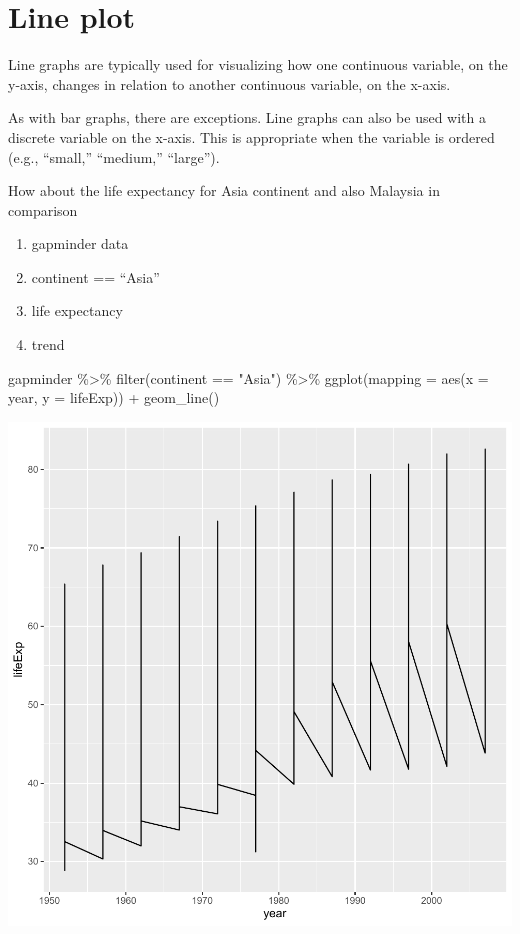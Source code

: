 \documentclass[
]{book}
\makeatletter
\newenvironment{Shaded}{\begin{snugshade}}{\end{snugshade}}
\newcommand{\AttributeTok}[1]{\textcolor[rgb]{0.61,0.61,0.61}{#1}}
\newcommand{\FunctionTok}[1]{\textcolor[rgb]{0,0,0}{#1}}
\newcommand{\NormalTok}[1]{#1}
\newcommand{\SpecialCharTok}[1]{\textcolor[rgb]{0,0,0}{#1}}
\newcommand{\StringTok}[1]{\textcolor[rgb]{0.5,0.5,0.5}{#1}}
\providecommand{\tightlist}{%
  \setlength{\itemsep}{0pt}\setlength{\parskip}{0pt}}
\newenvironment{kframe}{%
\medskip{}
\setlength{\fboxsep}{.8em}
 \def\at@end@of@kframe{}%
 \ifinner\ifhmode%
  \def\at@end@of@kframe{\end{minipage}}%
  \begin{minipage}{\columnwidth}%
 \fi\fi%
 \def\FrameCommand##1{\hskip\@totalleftmargin \hskip-\fboxsep
 \colorbox{shadecolor}{##1}\hskip-\fboxsep
     \hskip-\linewidth \hskip-\@totalleftmargin \hskip\columnwidth}%
 \MakeFramed {\advance\hsize-\width
   \@totalleftmargin\z@ \linewidth\hsize
   \@setminipage}}%
 {\par\unskip\endMakeFramed%
 \at@end@of@kframe}
\renewenvironment{Shaded}{\begin{kframe}}{\end{kframe}}
\makeatother
\begin{document}
\hypertarget{line-plot}{%
\section{Line plot}\label{line-plot}}

Line graphs are typically used for visualizing how one continuous variable, on the y-axis, changes in relation to another continuous variable, on the x-axis.

As with bar graphs, there are exceptions. Line graphs can also be used with a discrete variable on the x-axis. This is appropriate when the variable is ordered (e.g., ``small,'' ``medium,'' ``large'').

How about the life expectancy for Asia continent and also Malaysia in comparison

\begin{enumerate}
\def\labelenumi{\arabic{enumi}.}
\tightlist
\item
  gapminder data
\item
  continent == ``Asia''
\item
  life expectancy
\item
  trend
\end{enumerate}

\begin{Shaded}
\begin{Highlighting}[]
\NormalTok{gapminder }\SpecialCharTok{\%\textgreater{}\%} \FunctionTok{filter}\NormalTok{(continent }\SpecialCharTok{==} \StringTok{"Asia"}\NormalTok{) }\SpecialCharTok{\%\textgreater{}\%}
\FunctionTok{ggplot}\NormalTok{(}\AttributeTok{mapping =} \FunctionTok{aes}\NormalTok{(}\AttributeTok{x =}\NormalTok{ year, }\AttributeTok{y =}\NormalTok{ lifeExp)) }\SpecialCharTok{+}
  \FunctionTok{geom\_line}\NormalTok{()}
\end{Highlighting}
\end{Shaded}

\begin{center}\includegraphics[width=0.7\linewidth,keepaspectratio]{Multivariable_Data_Analysis_files/figure-latex/unnamed-chunk-89-1} \end{center}
\end{document}
